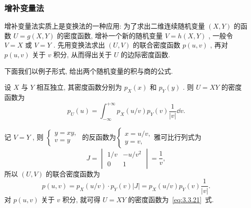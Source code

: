         \subsubsection{增补变量法}
        增补变量法实质上是变换法的一种应用: 为了求出二维连续随机变量 $(X,Y)$ 的函数 $U=g(X,Y)$ 的密度函数, 增补一个新的随机变量 $V=h(X,Y)$ , 一般令 $V=X$ 或 $V=Y$ . 先用变换法求出 $(U,V)$ 的联合密度函数 $p(u,v)$ , 再对 $p(u,v)$ 关于 $v$ 积分, 从而得出关于 $U$ 的边际密度函数.

        下面我们以例子形式, 给出两个随机变量的积与商的公式.
      \begin{example}[(积的公式)]\label{exam:3.3.10}
      	设 $X$ 与 $Y$ 相互独立, 其密度函数分别为 $p_{X}(x)$ 和 $p_{Y}(y)$ . 则 $U=XY$ 的密度函数为
      	\begin{equation}\label{eq:3.3.21}
      		p_{U}(u)=\int_{-\infty}^{+\infty}p_{X}(u/v)p_{Y}(v)\frac{1}{|v|}\dd v.
      	\end{equation}
      	\begin{solution}
      		记 $V=Y$ , 则 $\begin{cases}
      		y=xy,\\
      		v=y
      		\end{cases}$ 的反函数为$\begin{cases}
      		x=u/v,\\
      		y=v,
      		\end{cases}$雅可比行列式为
      		\begin{equation*}
      			J=\begin{vmatrix}
      			1/v & -u/v^2\\
      			0 & 1
      			\end{vmatrix}=\frac{1}{v},
      		\end{equation*}
      		所以 $(U,V)$ 的联合密度函数为
      		\begin{equation*}
      			p(u,v)=p_{X}(u/v)\cdot p_{Y}(v)|J|=p_{X}(u/v)p_{Y}(v)\frac{1}{|v|}.
      		\end{equation*}
      		对 $p(u,v)$ 关于 $v$ 积分, 就可得 $U=XY$ 的密度函数为~\eqref{eq:3.3.21}~式.
      	\end{solution}
      \end{example}
